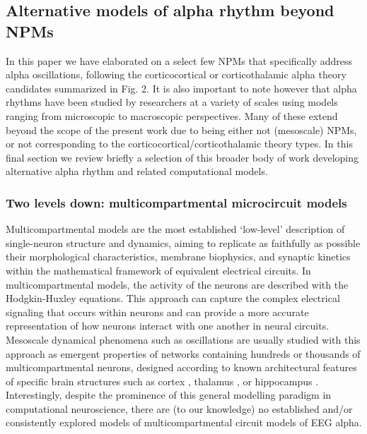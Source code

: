 \documentclass[12pt,twoside]{article}
\begin{document}
\subsection{Alternative models of alpha rhythm beyond NPMs}

In this paper we have elaborated on a select few NPMs that specifically address alpha oscillations, following the corticocortical or corticothalamic alpha theory candidates summarized in Fig. 2. It is also important to note however that alpha rhythms have been studied by researchers at a variety of scales using models ranging from microscopic to macroscopic perspectives. Many of these extend beyond the scope of the present work due to being either not (mesoscale) NPMs, or not corresponding to the corticocortical/corticothalamic theory types. In this final section we review briefly a selection of this broader body of work developing alternative alpha rhythm and related computational models.


\subsubsection{Two levels down:  multicompartmental microcircuit models}
Multicompartmental models are the most established `low-level' description of single-neuron structure and dynamics, aiming to replicate as faithfully as possible their morphological characteristics, membrane biophysics, and synaptic kinetics within the mathematical framework of equivalent electrical circuits. In multicompartmental models, the activity of the neurons are described with the Hodgkin-Huxley equations. This approach can capture the complex electrical signaling that occurs within neurons and can provide a more accurate representation of how neurons interact with one another in neural circuits. Mesoscale dynamical phenomena such as oscillations are usually studied with this approach as emergent properties of networks containing hundreds or thousands of multicompartmental neurons, designed according to known architectural features of specific brain structures such as cortex \citep{hay2011models}, thalamus \citep{iavarone2023thalamic}, or hippocampus \citep{chatzikalymniou2021linking}. Interestingly, despite the prominence of this general modelling paradigm in computational neuroscience, there are (to our knowledge) no established and/or consistently explored models of multicompartmental circuit models of EEG alpha. 
\end{document}
